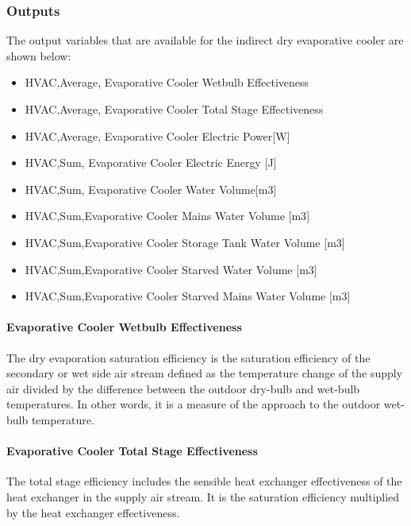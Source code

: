\subsubsection{Outputs}\label{outputs-2-008}

The output variables that are available for the indirect dry evaporative cooler are shown below:

\begin{itemize}
\item
  HVAC,Average, Evaporative Cooler Wetbulb Effectiveness
\item
  HVAC,Average, Evaporative Cooler Total Stage Effectiveness
\item
  HVAC,Average, Evaporative Cooler Electric Power{[}W{]}
\item
  HVAC,Sum, Evaporative Cooler Electric Energy {[}J{]}
\item
  HVAC,Sum, Evaporative Cooler Water Volume{[}m3{]}
\item
  HVAC,Sum,Evaporative Cooler Mains Water Volume {[}m3{]}
\item
  HVAC,Sum,Evaporative Cooler Storage Tank Water Volume {[}m3{]}
\item
  HVAC,Sum,Evaporative Cooler Starved Water Volume {[}m3{]}
\item
  HVAC,Sum,Evaporative Cooler Starved Mains Water Volume {[}m3{]}
\end{itemize}

\paragraph{Evaporative Cooler Wetbulb Effectiveness}\label{evaporative-cooler-wetbulb-effectiveness}

The dry evaporation saturation efficiency is the saturation efficiency of the secondary or wet side air stream defined as the temperature change of the supply air divided by the difference between the outdoor dry-bulb and wet-bulb temperatures. In other words, it is a measure of the approach to the outdoor wet-bulb temperature.

\paragraph{Evaporative Cooler Total Stage Effectiveness}\label{evaporative-cooler-total-stage-effectiveness}

The total stage efficiency includes the sensible heat exchanger effectiveness of the heat exchanger in the supply air stream. It is the saturation efficiency multiplied by the heat exchanger effectiveness.

